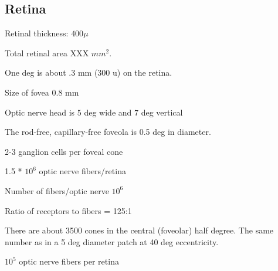 \subsection*{Retina}

\be

\item Retinal thickness: $400 \mu$

\item Total retinal area XXX $mm ^ 2$.

\item One deg is about .3 mm (300 u) on the retina.

\item Size of fovea 0.8 mm 

\item Optic nerve head is $5$ deg wide and $7$ deg vertical

\item The rod-free, capillary-free foveola is 0.5 deg in diameter.

\item 2-3 ganglion cells per foveal cone

\item 1.5 * $10^6$ optic nerve fibers/retina 

\item Number of fibers/optic nerve $10^6$

\item Ratio of receptors to fibers = 125:1

\item There are about  3500 cones in the central (foveolar) half degree.  
The same number as in a 5 deg diameter patch at 40 deg eccentricity.

\item [Cat] $10^5$ optic nerve fibers per retina

\ee

